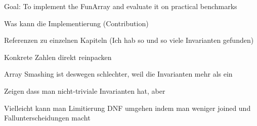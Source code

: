 Goal: To implement the FunArray and evaluate it on practical benchmarks

Was kann die Implementierung (Contribution)

Referenzen zu einzelnen Kapiteln (Ich hab so und so viele Invarianten gefunden)

Konkrete Zahlen direkt reinpacken


Array Smashing ist deswegen schlechter, weil die Invarianten mehr als ein

Zeigen dass man nicht-triviale Invarianten hat, aber 


Vielleicht kann man Limitierung DNF umgehen indem man weniger joined und Fallunterscheidungen macht




















 